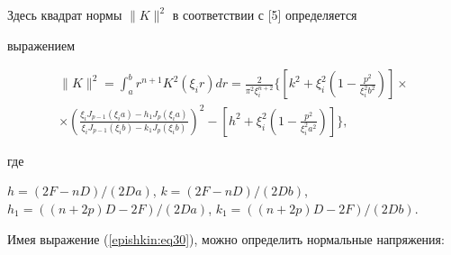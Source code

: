 Здесь квадрат нормы $\| K \|^2$ в соответствии с [5] определяется 

выражением

\begin{multline}

\label{epishkin:eq31}

 \| K \|^2=

 \int_a^b r^{n+1}  K^2(\xi _i r) dr=

 \frac{2}{\pi ^2  \xi _i ^{n+2} } \Biggl\{

 \left[ k^2+\xi _i ^2   \left(1-\frac{p^2}{\xi _i ^2   b^2} \right) \right] 

 \times \\ 

\times \left(\frac{\xi _i  J_{p-1} (\xi _i a)-h_1 J_p(\xi _i a) } {\xi _i  J_{p-1} (\xi _i b)-k_1 J_p (\xi _i b)}\right)^2-

\left[h^2+\xi _i ^2   \left( 1-\frac{p^2}{\xi _i ^2   a^2} \right) \right]\Biggr\} , 

\end{multline}

где

$ h=(2  F-n  D)/({2  D  a})$, $k=(2  F-n  D)/({2  D  b})$,  $h_1 =((n+2  p)  D-2F)/({2  D  a})$, $k_1 =({(n+2  p)  D-2F})/({2  D  b})$.



Имея выражение (\ref{epishkin:eq30}), можно определить нормальные напряжения:

